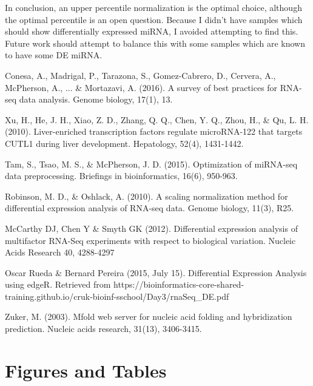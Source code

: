 \documentclass{bioinfo}
\begin{document}
In conclusion, an upper percentile normalization is the optimal choice, although the optimal percentile is an open question.
Because I didn't have samples which should show differentially expressed miRNA, I avoided attempting to find this. Future work should attempt to balance this with some samples which are known to have some DE miRNA. 




\begin{thebibliography}{}

Conesa, A., Madrigal, P., Tarazona, S., Gomez-Cabrero, D., Cervera, A., McPherson, A., ... \& Mortazavi, A. (2016). A survey of best practices for RNA-seq data analysis. Genome biology, 17(1), 13.

Xu, H., He, J. H., Xiao, Z. D., Zhang, Q. Q., Chen, Y. Q., Zhou, H., \& Qu, L. H. (2010). Liver-enriched transcription factors regulate microRNA-122 that targets CUTL1 during liver development. Hepatology, 52(4), 1431-1442.

 Tam, S., Tsao, M. S., \& McPherson, J. D. (2015). Optimization of miRNA-seq data preprocessing. Briefings in bioinformatics, 16(6), 950-963.

Robinson, M. D., \& Oshlack, A. (2010). A scaling normalization method for differential expression analysis of RNA-seq data. Genome biology, 11(3), R25.

McCarthy DJ, Chen Y \& Smyth GK (2012). Differential expression analysis of multifactor RNA-Seq experiments with respect to biological variation. Nucleic Acids Research 40, 4288-4297

Oscar Rueda \& Bernard Pereira (2015, July 15). Differential Expression Analysis using edgeR. Retrieved from https://bioinformatics-core-shared-training.github.io/cruk-bioinf-sschool/Day3/rnaSeq\_DE.pdf

Zuker, M. (2003). Mfold web server for nucleic acid folding and hybridization prediction. Nucleic acids research, 31(13), 3406-3415.


\end{thebibliography}


\section{Figures and Tables}
\onecolumn
\end{document}
